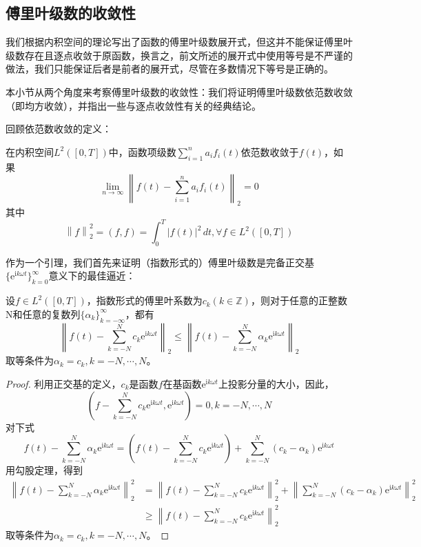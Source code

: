 \subsection{傅里叶级数的收敛性}\label{sub:fourier_series_convergency}

我们根据内积空间的理论写出了函数的傅里叶级数展开式，但这并不能保证傅里叶级数存在且逐点收敛于原函数，换言之，前文所述的展开式中使用等号是不严谨的做法，我们只能保证后者是前者的展开式，尽管在多数情况下等号是正确的。

本小节从两个角度来考察傅里叶级数的收敛性：我们将证明傅里叶级数依范数收敛（即均方收敛），并指出一些与逐点收敛性有关的经典结论。

回顾依范数收敛的定义：
\begin{definition}
    在内积空间$L^2([0,T])$中，函数项级数$\sum_{i = 1}^{n}  a_i f_i(t)$依范数收敛于$f(t)$，如果
    \[\lim_{n \to \infty} \left\| f(t)-\sum_{i = 1}^{n}  a_i f_i(t)\right\|_2=0\]
    其中
    \[\left\|f\right\|_2^2=(f,f)=\int_{0}^{T}|f(t)|^2\,dt,\forall f\in L^2([0,T])\]
\end{definition}

作为一个引理，我们首先来证明（指数形式的）傅里叶级数是完备正交基$\{\mathrm{e}^{\mathrm{i}k\omega t}\}_{k=0}^{\infty}$意义下的最佳逼近：
\begin{lemma}
    设$f\in L^2([0,T])$，指数形式的傅里叶系数为$c_k(k\in\mathbb{Z} )$，则对于任意的正整数N和任意的复数列$\{\alpha_k\}_{k=-\infty}^{\infty}$，都有
    \[\left\|f(t)-\sum_{k=-N}^{N}c_k \mathrm{e}^{\mathrm{i}k\omega t}\right\|_2\leq\left\|f(t)-\sum_{k=-N}^{N}\alpha_k \mathrm{e}^{\mathrm{i}k\omega t}\right\|_2\]
    取等条件为$\alpha_k=c_k,k=-N,\cdots,N$。
\end{lemma}
\begin{proof}
    利用正交基的定义，$c_k$是函数$f$在基函数$\mathrm{e}^{\mathrm{i}k\omega t}$上投影分量的大小，因此，
    \[\left(f-\sum_{k=-N}^{N}c_k \mathrm{e}^{\mathrm{i}k\omega t},\mathrm{e}^{\mathrm{i}k\omega t}\right)=0,k=-N,\cdots,N\]
    对下式
    \[f(t)-\sum_{k=-N}^{N}\alpha_k \mathrm{e}^{\mathrm{i}k\omega t}=\left(f(t)-\sum_{k=-N}^{N}c_k \mathrm{e}^{\mathrm{i}k\omega t}\right)+\sum_{k=-N}^{N}(c_k-\alpha_k) \mathrm{e}^{\mathrm{i}k\omega t}\]
    用勾股定理，得到
    \begin{align*}
        \left\|f(t)-\sum_{k=-N}^{N}\alpha_k \mathrm{e}^{\mathrm{i}k\omega t}\right\|_2^2&=\left\|f(t)-\sum_{k=-N}^{N}c_k \mathrm{e}^{\mathrm{i}k\omega t}\right\|_2^2+\left\|\sum_{k=-N}^{N}(c_k-\alpha_k) \mathrm{e}^{\mathrm{i}k\omega t}\right\|_2^2\\
        &\geq \left\|f(t)-\sum_{k=-N}^{N}c_k \mathrm{e}^{\mathrm{i}k\omega t}\right\|_2^2
    \end{align*}
    取等条件为$\alpha_k=c_k,k=-N,\cdots,N$。
\end{proof}

